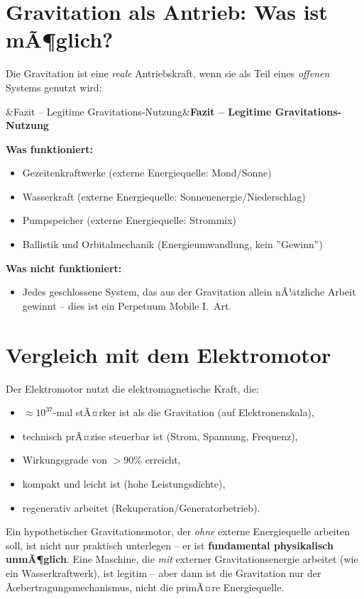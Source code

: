 ﻿\documentclass[12pt, a4paper]{report}
\newenvironment{ergebnis}[1][]{%
  \begin{ergebnisframe}\sloppy%
  \ifx&#1&\else\textbf{#1}\par\smallskip\fi}{\end{ergebnisframe}}
\theoremstyle{definition}
\theoremstyle{remark}
\begin{document}
\section{Gravitation als Antrieb: Was ist mÃ¶glich?}

Die Gravitation ist eine \emph{reale} Antriebskraft, wenn sie als Teil eines
\emph{offenen} Systems genutzt wird:

\begin{ergebnis}[Fazit -- Legitime Gravitations-Nutzung]
  \textbf{Was funktioniert:}
  \begin{itemize}
    \item Gezeitenkraftwerke (externe Energiequelle: Mond/Sonne)
    \item Wasserkraft (externe Energiequelle: Sonnenenergie/Niederschlag)
    \item Pumpspeicher (externe Energiequelle: Strommix)
    \item Ballistik und Orbitalmechanik (Energieumwandlung, kein ''Gewinn'')
  \end{itemize}
  \textbf{Was nicht funktioniert:}
  \begin{itemize}
    \item Jedes geschlossene System, das aus der Gravitation allein nÃ¼tzliche
          Arbeit gewinnt -- dies ist ein Perpetuum Mobile I.\ Art.
  \end{itemize}
\end{ergebnis}

\section{Vergleich mit dem Elektromotor}

Der Elektromotor nutzt die elektromagnetische Kraft, die:
\begin{itemize}
  \item $\approx 10^{37}$-mal stÃ¤rker ist als die Gravitation (auf Elektronenskala),
  \item technisch prÃ¤zise steuerbar ist (Strom, Spannung, Frequenz),
  \item Wirkungsgrade von $>90\%$ erreicht,
  \item kompakt und leicht ist (hohe Leistungsdichte),
  \item regenerativ arbeitet (Rekuperation/Generatorbetrieb).
\end{itemize}

Ein hypothetischer Gravitationsmotor, der \emph{ohne} externe Energiequelle arbeiten
soll, ist nicht nur praktisch unterlegen -- er ist \textbf{fundamental physikalisch
unmÃ¶glich}. Eine Maschine, die \emph{mit} externer Gravitationsenergie arbeitet
(wie ein Wasserkraftwerk), ist legitim -- aber dann ist die Gravitation nur der
Ãœbertragungsmechanismus, nicht die primÃ¤re Energiequelle.
\end{document}
